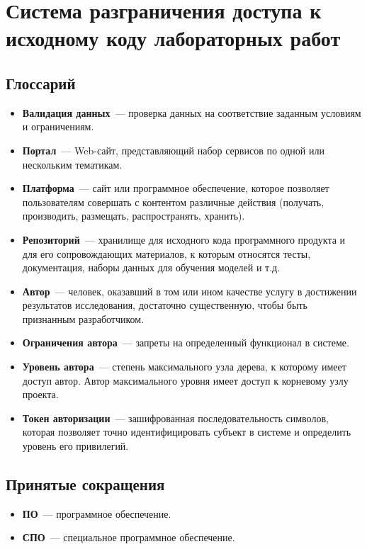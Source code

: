 \documentclass{bmstu}
\begin{document}
  \chapter*{Система разграничения доступа к исходному коду
  лабораторных работ}

  \section*{Глоссарий}

  \begin{itemize}
    \item[] \textbf{Валидация данных}~--- проверка данных на
      соответствие заданным условиям и ограничениям.
    \item[] \textbf{Портал}~--- Web-сайт, представляющий набор
      сервисов по одной или нескольким тематикам.
    \item[] \textbf{Платформа}~--- сайт или программное обеспечение,
      которое позволяет пользователям совершать с контентом различные
      действия (получать, производить, размещать, распространять,
      хранить).
    \item[] \textbf{Репозиторий}~--- хранилище для исходного кода
      программного продукта и для его сопровождающих материалов, к
      которым относятся тесты, документация, наборы данных для
      обучения моделей и т.д.
    \item[] \textbf{Автор}~--- человек, оказавший в том или ином
      качестве услугу в достижении результатов исследования,
      достаточно существенную, чтобы быть признанным разработчиком.
    \item[] \textbf{Ограничения автора}~--- запреты на определенный
      функционал в системе.
    \item[] \textbf{Уровень автора}~--- степень максимального узла
      дерева, к которому имеет доступ автор. Автор максимального
      уровня имеет доступ к корневому узлу проекта.
    \item[] \textbf{Токен авторизации}~--- зашифрованная
      последовательность символов, которая позволяет точно
      идентифицировать субъект в системе и определить уровень его
      привилегий.
  \end{itemize}

  \section*{Принятые сокращения}

  \begin{itemize}
    \item[] \textbf{ПО}~--- программное обеспечение.
    \item[] \textbf{СПО}~--- специальное программное обеспечение.
  \end{itemize}
\end{document}

